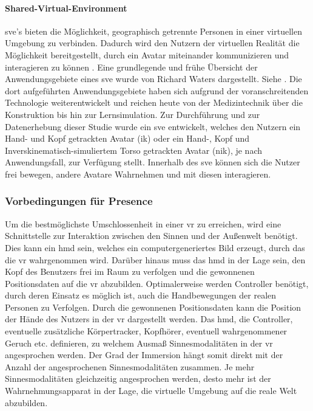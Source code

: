 \documentclass[a4paper,11pt]{article}%
\renewcommand{\\}{\vspace*{0.5\baselineskip} \newline}
\begin{document}
\paragraph{Shared-Virtual-Environment}
	\ac{sve}'s bieten die Möglichkeit, geographisch getrennte Personen in einer virtuellen Umgebung zu verbinden. Dadurch wird den Nutzern der virtuellen Realität die Möglichkeit bereitgestellt, durch ein Avatar miteinander kommunizieren und interagieren zu können \citep[p. 1-3]{pettifer1999designing}. Eine grundlegende und frühe Übersicht der Anwendungsgebiete eines \ac{sve} wurde von Richard Waters dargestellt. Siehe \citep{waters1997rise}. Die dort aufgeführten Anwendungsgebiete haben sich aufgrund der voranschreitenden Technologie weiterentwickelt und reichen heute von der Medizintechnik über die Konstruktion bis hin zur Lernsimulation.
	Zur Durchführung und zur Datenerhebung dieser Studie wurde ein \ac{sve} entwickelt, welches den Nutzern ein \dq{}Hand- und Kopf getrackten Avatar\dq{} (\ac{ik}) oder ein \dq{}Hand-, Kopf und Inverskinematisch-simuliertem Torso getrackten Avatar\dq{} (\ac{nik}), je nach Anwendungsfall, zur Verfügung stellt. Innerhalb des \ac{sve} können sich die Nutzer frei bewegen, andere Avatare Wahrnehmen und mit diesen interagieren.
	
	
		\subsubsection{Vorbedingungen für Presence}
Um die bestmöglichste Umschlossenheit in einer \ac{vr} zu erreichen, wird eine Schnittstelle zur Interaktion zwischen den Sinnen und der Außenwelt benötigt. Dies kann ein \ac{hmd} sein, welches ein computergeneriertes Bild erzeugt, durch das die \ac{vr} wahrgenommen wird. Darüber hinaus muss das \ac{hmd} in der Lage sein, den Kopf des Benutzers frei im Raum zu verfolgen und die gewonnenen Positionsdaten auf die \ac{vr} abzubilden. Optimalerweise werden Controller benötigt, durch deren Einsatz es möglich ist, auch die Handbewegungen der realen Personen zu Verfolgen. Durch die gewonnenen Positionsdaten kann die Position der Hände des Nutzers in der \ac{vr} dargestellt werden. Das \ac{hmd}, die Controller, eventuelle zusätzliche Körpertracker, Kopfhörer, eventuell wahrgenommener Geruch etc. definieren, zu welchem Ausmaß Sinnesmodalitäten in der \ac{vr} angesprochen werden. Der Grad der Immersion hängt somit direkt mit der Anzahl der angesprochenen Sinnesmodalitäten zusammen. Je mehr Sinnesmodalitäten gleichzeitig angesprochen werden, desto mehr ist der Wahrnehmungsapparat in der Lage, die virtuelle Umgebung auf die reale Welt abzubilden.
\end{document}
